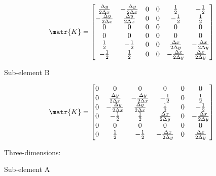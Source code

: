\begin{equation}
  \matr{K}=\begin{bmatrix}
  \frac{\Delta y}{2\Delta x} & -\frac{\Delta y}{2\Delta x} & 0 & 0 & \frac{1}{2} & -\frac{1}{2} \\
  -\frac{\Delta y}{2\Delta x} & \frac{\Delta y}{2\Delta x} & 0 & 0 & -\frac{1}{2} & \frac{1}{2} \\
  0 & 0 & 0 & 0 & 0 & 0 \\
  0 & 0 & 0 & 0 & 0 & 0 \\
  \frac{1}{2} & -\frac{1}{2} & 0 & 0 & \frac{\Delta x}{2\Delta y} & -\frac{\Delta x}{2\Delta y} \\
  -\frac{1}{2} & \frac{1}{2} & 0 & 0 & -\frac{\Delta x}{2\Delta y} & \frac{\Delta x}{2\Delta y}
  \end{bmatrix}
\end{equation}

Sub-element B

\begin{equation}
  \matr{K}=\begin{bmatrix}
  0 & 0 & 0 & 0 & 0 & 0 \\
  0 & \frac{\Delta y}{2\Delta x} & -\frac{\Delta y}{2\Delta x} & -\frac{1}{2} & 0 & \frac{1}{2} \\
  0 & -\frac{\Delta y}{2\Delta x} & \frac{\Delta y}{2\Delta x} & \frac{1}{2} & 0 & -\frac{1}{2} \\
  0 & -\frac{1}{2} & \frac{1}{2} & \frac{\Delta x}{2\Delta y} & 0 & -\frac{\Delta x}{2\Delta y} \\
  0 & 0 & 0 & 0 & 0 & 0 \\
  0 & \frac{1}{2} & -\frac{1}{2} & -\frac{\Delta x}{2\Delta y} & 0 & \frac{\Delta x}{2\Delta y}
  \end{bmatrix}
\end{equation}


Three-dimensions:

Sub-element A

